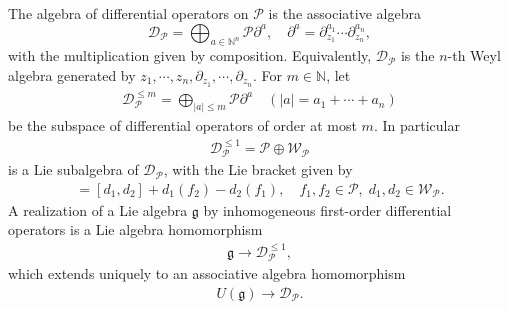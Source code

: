 \documentclass[12pt]{article}
\numberwithin{equation}{section}
\theoremstyle{definition}
\theoremstyle{remark}
\begin{document}
The algebra of differential operators on $\mathscr{P}$ is the associative algebra
\begin{equation}
	\mathscr{D}_{\mathscr{P}}=\bigoplus_{a\in\mathbb{N}^n}\mathscr{P}\partial^{a}, \quad \partial^{a}=\partial_{z_1}^{a_1}\cdots\partial_{z_n}^{a_n},
\end{equation}
with the multiplication given by composition. Equivalently, $\mathscr{D}_{\mathscr{P}}$ is the $n$-th Weyl algebra generated by $z_1,\cdots,z_n,\partial_{z_1},\cdots,\partial_{z_n}$. For $m\in\mathbb{N}$, let
\begin{eqnarray*}
	\mathscr{D}_{\mathscr{P}}^{\leqslant m}=\bigoplus_{|a|\leqslant m}\mathscr{P}\partial^{a}\quad (|a|=a_1+\cdots+a_n)
\end{eqnarray*}
be the subspace of differential operators of order at most $m$. In particular
\begin{eqnarray}
	\mathscr{D}_{\mathscr{P}}^{\leqslant 1}=\mathscr{P}\oplus\mathscr{W}_{\mathscr{P}}
\end{eqnarray}
is a Lie subalgebra of $\mathscr{D}_{\mathscr{P}}$, with the Lie bracket given by
\begin{eqnarray}
	[f_1+d_1,f_2+d_2]=[d_1,d_2]+d_1(f_2)-d_2(f_1),\quad f_1,f_2\in\mathscr{P},\;d_1,d_2\in\mathscr{W}_{\mathscr{P}}.
\end{eqnarray}
A realization of a Lie algebra $\mathfrak{g}$ by inhomogeneous first-order differential operators is a Lie algebra homomorphism
\begin{eqnarray*}
	\mathfrak{g}\longrightarrow \mathscr{D}_{\mathscr{P}}^{\leqslant1},
\end{eqnarray*}
which extends uniquely to an associative algebra homomorphism
\begin{eqnarray}
	U(\mathfrak{g})\longrightarrow \mathscr{D}_{\mathscr{P}}.
\end{eqnarray}
\end{document}
